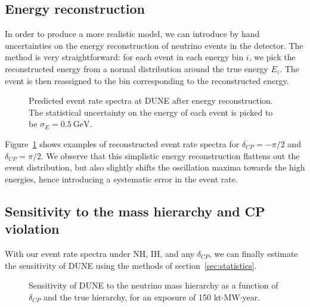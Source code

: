\subsection{Energy reconstruction}
In order to produce a more realistic model, we can introduce by hand
uncertainties on the energy reconstruction of neutrino events in the detector.
The method is very straightforward: for each event in each energy bin $i$, we
pick the reconstructed energy from a normal distribution around the true energy
$E_i$. The event is then reassigned to the bin corresponding to the
reconstructed energy.
\begin{figure}
	\centering
	\caption{Predicted event rate spectra at DUNE after energy reconstruction.
	The statistical uncertainty on the energy of each event is picked to be
	$\sigma_E = \SI{0.5}{\GeV}$.}
\label{fig:event_rate_reconstructed}
\end{figure}

Figure~\ref{fig:event_rate_reconstructed} shows examples of reconstructed event
rate spectra for $\delta_{CP}=-\pi/2$ and $\delta_{CP}=\pi/2$. We observe that
this simplistic energy reconstruction flattens out the event distribution, but
also slightly shifts the oscillation maxima towards the high energies, hence
introducing a systematic error in the event rate.

\subsection{Sensitivity to the mass hierarchy and CP violation}
With our event rate spectra under NH, IH, and any $\delta_{CP}$, we can finally
estimate the sensitivity of DUNE using the methods of
section~\ref{sec:statistics}. 
\begin{figure}
	\centering
\caption{Sensitivity of DUNE to the neutrino mass hierarchy as a
	function of $\delta_{CP}$ and the true hierarchy, for an exposure of
	150 kt$\cdot$MW$\cdot$year.}
	\label{fig:sens_mh}
\end{figure}


